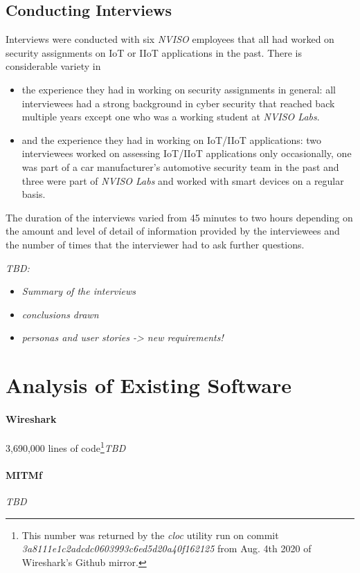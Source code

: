 \subsection{Conducting Interviews}
Interviews were conducted with six %
\emph{NVISO} employees that all had worked on security assignments on \ac{IoT} or \ac{IIoT} applications in the past. There is considerable variety in
\begin{itemize}
    \item the experience they had in working on security assignments in general: all interviewees had a strong background in cyber security that reached back multiple years except one who was a working student at \emph{NVISO Labs}.
    \item and the experience they had in working on \ac{IoT}/\ac{IIoT} applications: two interviewees worked on assessing \ac{IoT}/\ac{IIoT} applications only occasionally, one was part of a car manufacturer's automotive security team in the past and three were part of \emph{NVISO Labs} and worked with smart devices on a regular basis.
\end{itemize}
The duration of the interviews varied from 45 minutes to two hours depending on the amount and level of detail of information provided by the interviewees and the number of times that the interviewer had to ask further questions.

\emph{TBD:} %
\begin{itemize}
    \item \emph{Summary of the interviews}
    \item \emph{conclusions drawn}
    \item \emph{personas and user stories -> new requirements!}
\end{itemize}

\section{Analysis of Existing Software}
\paragraph{Wireshark} 3,690,000 lines of code\footnote{This number was returned by the \emph{cloc} utility run on commit \emph{3a8111e1c2adcdc0603993c6ed5d20a40f162125} from Aug. 4th 2020 of Wireshark's Github mirror.}\emph{TBD}
\paragraph{MITMf} \emph{TBD}
